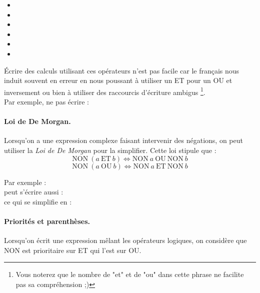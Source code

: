 			\begin{small}
			\begin{multicols}{2}
				\begin{itemize}
					\item {}
					\item {}
					\item {}
					\item {}
					\item {}
					\item {}
				\end{itemize}
			\end{multicols}
			\end{small}
	
			Écrire des calculs utilisant ces opérateurs n'est pas facile
			car le français nous induit souvent en erreur
			en nous poussant à utiliser un ET pour un OU et inversement
			ou bien à utiliser des raccourcis d'écriture ambigus%
			\footnote{%
				Vous noterez que le nombre de "et" et de "ou"
				dans cette phrase ne facilite pas sa compréhension ;)%
			}. 
			\\Par exemple, ne pas écrire : 
	
			\paragraph{Loi de De Morgan.}
				Lorsqu'on a une expression complexe faisant intervenir
				des négations, on peut utiliser la \emph{Loi de De Morgan}
				pour la simplifier.
				Cette loi stipule que :
				\[
					\mathrm{NON}\ (a\ \mathrm{ET}\ b) \Leftrightarrow \mathrm{NON}\ a\ \mathrm{OU}\ \mathrm{NON}\ b
				\]
				\[
					\mathrm{NON}\ (a\ \mathrm{OU}\ b) \Leftrightarrow \mathrm{NON}\ a\ \mathrm{ET}\ \mathrm{NON}\ b
				\]
				
				Par exemple : 
				\\peut s'écrire aussi : 
				\\ce qui se simplifie en : 
	
			\paragraph{Priorités et parenthèses.}
				Lorsqu'on écrit une expression mêlant les opérateurs logiques,
				on considère que NON est prioritaire sur ET qui l'est sur OU.
				
